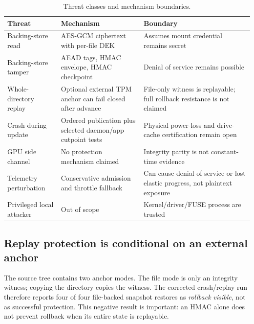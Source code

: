 \begin{table}[t]
\centering
\caption{Threat classes and mechanism boundaries.}
\scriptsize
\setlength{\tabcolsep}{3pt}
\begin{tabularx}{\columnwidth}{P{0.24\columnwidth}|P{0.30\columnwidth}|Y}
\toprule
\textbf{Threat} & \textbf{Mechanism} & \textbf{Boundary}\\
\midrule
Backing-store read & AES-GCM ciphertext with per-file DEK & Assumes mount credential remains secret\\
Backing-store tamper & AEAD tags, HMAC envelope, HMAC checkpoint & Denial of service remains possible\\
Whole-directory replay & Optional external TPM anchor can fail closed after advance & File-only witness is replayable; full rollback resistance is not claimed\\
Crash during update & Ordered publication plus selected daemon/app cutpoint tests & Physical power-loss and drive-cache certification remain open\\
GPU side channel & No protection mechanism claimed & Integrity parity is not constant-time evidence\\
Telemetry perturbation & Conservative admission and throttle fallback & Can cause denial of service or lost elastic progress, not plaintext exposure\\
Privileged local attacker & Out of scope & Kernel/driver/FUSE process are trusted\\
\bottomrule
\end{tabularx}
\label{tab:threat_boundary}
\end{table}

\subsection{Replay protection is conditional on an external anchor}
\label{sec:case_problem}

The source tree contains two anchor modes.  The file mode is only an integrity witness; copying the directory copies the witness.  The corrected crash/replay run therefore reports four of four file-backed snapshot restores as \emph{rollback visible}, not as successful protection.  This negative result is important: an HMAC alone does not prevent rollback when its entire state is replayable.

